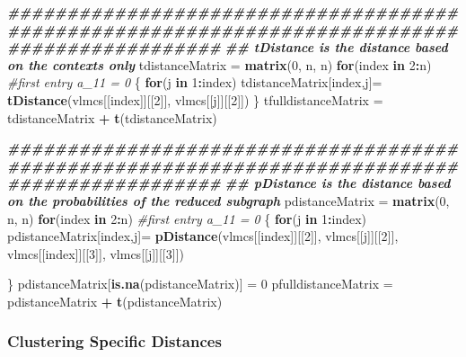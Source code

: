 \documentclass[
]{article}
\newenvironment{Shaded}{\begin{snugshade}}{\end{snugshade}}
\newcommand{\CommentTok}[1]{\textcolor[rgb]{0.56,0.35,0.01}{\textit{#1}}}
\newcommand{\ControlFlowTok}[1]{\textcolor[rgb]{0.13,0.29,0.53}{\textbf{#1}}}
\newcommand{\DecValTok}[1]{\textcolor[rgb]{0.00,0.00,0.81}{#1}}
\newcommand{\DocumentationTok}[1]{\textcolor[rgb]{0.56,0.35,0.01}{\textbf{\textit{#1}}}}
\newcommand{\FunctionTok}[1]{\textcolor[rgb]{0.13,0.29,0.53}{\textbf{#1}}}
\newcommand{\NormalTok}[1]{#1}
\newcommand{\OtherTok}[1]{\textcolor[rgb]{0.56,0.35,0.01}{#1}}
\newcommand{\SpecialCharTok}[1]{\textcolor[rgb]{0.81,0.36,0.00}{\textbf{#1}}}
\begin{document}
\begin{Shaded}
\begin{Highlighting}[]
\DocumentationTok{\#\#\#\#\#\#\#\#\#\#\#\#\#\#\#\#\#\#\#\#\#\#\#\#\#\#\#\#\#\#\#\#\#\#\#\#\#\#\#\#\#\#\#\#\#\#\#\#\#\#\#\#\#\#\#\#\#\#\#\#\#\#\#\#\#\#\#\#\#\#\#\#\#\#\#\#\#\#\#\#\#\#\#\#\#\#\#\#\#\#\#\#\#\#}
\DocumentationTok{\#\# tDistance is the distance based on the contexts only}
\NormalTok{tdistanceMatrix }\OtherTok{=} \FunctionTok{matrix}\NormalTok{(}\DecValTok{0}\NormalTok{, n, n)}
\ControlFlowTok{for}\NormalTok{(index }\ControlFlowTok{in} \DecValTok{2}\SpecialCharTok{:}\NormalTok{n) }\CommentTok{\#first entry a\_11 = 0}
\NormalTok{\{}
  \ControlFlowTok{for}\NormalTok{(j }\ControlFlowTok{in} \DecValTok{1}\SpecialCharTok{:}\NormalTok{index)}
\NormalTok{    tdistanceMatrix[index,j]}\OtherTok{=} \FunctionTok{tDistance}\NormalTok{(vlmcs[[index]][[}\DecValTok{2}\NormalTok{]], vlmcs[[j]][[}\DecValTok{2}\NormalTok{]])}
\NormalTok{\}}
\NormalTok{tfulldistanceMatrix }\OtherTok{=}\NormalTok{ tdistanceMatrix }\SpecialCharTok{+} \FunctionTok{t}\NormalTok{(tdistanceMatrix)}

\DocumentationTok{\#\#\#\#\#\#\#\#\#\#\#\#\#\#\#\#\#\#\#\#\#\#\#\#\#\#\#\#\#\#\#\#\#\#\#\#\#\#\#\#\#\#\#\#\#\#\#\#\#\#\#\#\#\#\#\#\#\#\#\#\#\#\#\#\#\#\#\#\#\#\#\#\#\#\#\#\#\#\#\#\#\#\#\#\#\#\#\#\#\#\#\#\#\#}
\DocumentationTok{\#\# pDistance is the distance based on the probabilities of the reduced subgraph}
\NormalTok{pdistanceMatrix }\OtherTok{=} \FunctionTok{matrix}\NormalTok{(}\DecValTok{0}\NormalTok{, n, n)}
\ControlFlowTok{for}\NormalTok{(index }\ControlFlowTok{in} \DecValTok{2}\SpecialCharTok{:}\NormalTok{n) }\CommentTok{\#first entry a\_11 = 0}
\NormalTok{\{}
  \ControlFlowTok{for}\NormalTok{(j }\ControlFlowTok{in} \DecValTok{1}\SpecialCharTok{:}\NormalTok{index)}
\NormalTok{    pdistanceMatrix[index,j]}\OtherTok{=} \FunctionTok{pDistance}\NormalTok{(vlmcs[[index]][[}\DecValTok{2}\NormalTok{]], vlmcs[[j]][[}\DecValTok{2}\NormalTok{]], vlmcs[[index]][[}\DecValTok{3}\NormalTok{]], vlmcs[[j]][[}\DecValTok{3}\NormalTok{]])}
  
\NormalTok{\}}
\NormalTok{pdistanceMatrix[}\FunctionTok{is.na}\NormalTok{(pdistanceMatrix)] }\OtherTok{=} \DecValTok{0}
\NormalTok{pfulldistanceMatrix }\OtherTok{=}\NormalTok{ pdistanceMatrix }\SpecialCharTok{+} \FunctionTok{t}\NormalTok{(pdistanceMatrix)}
\end{Highlighting}
\end{Shaded}

\subsubsection{Clustering Specific
Distances}\label{clustering-specific-distances}
\end{document}
